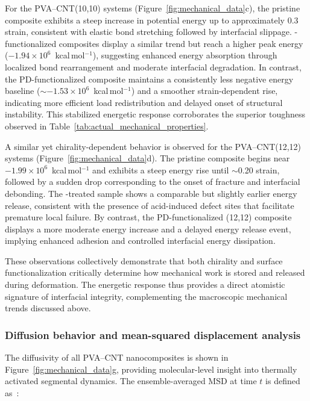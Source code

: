 \documentclass[journal=jacsat,manuscript=article]{achemso}
\begin{document}
{\medskip

For the PVA--CNT(10,10) systems (Figure~\ref{fig:mechanical_data}c), the pristine composite exhibits a steep increase in potential energy up to approximately 0.3 strain, consistent with elastic bond stretching followed by interfacial slippage. -functionalized composites display a similar trend but reach a higher peak energy ($-1.94\times10^{6}$~kcal\,mol$^{-1}$), suggesting enhanced energy absorption through localized bond rearrangement and moderate interfacial degradation. In contrast, the PD-functionalized composite maintains a consistently less negative energy baseline ($\sim-1.53\times10^{6}$~kcal\,mol$^{-1}$) and a smoother strain-dependent rise, indicating more efficient load redistribution and delayed onset of structural instability. This stabilized energetic response corroborates the superior toughness observed in Table~\ref{tab:actual_mechanical_properties}.

\medskip

A similar yet chirality-dependent behavior is observed for the PVA--CNT(12,12) systems (Figure~\ref{fig:mechanical_data}d). The pristine composite begins near $-1.99\times10^{6}$~kcal\,mol$^{-1}$ and exhibits a steep energy rise until $\sim$0.20 strain, followed by a sudden drop corresponding to the onset of fracture and interfacial debonding. The -treated sample shows a comparable but slightly earlier energy release, consistent with the presence of acid-induced defect sites that facilitate premature local failure. By contrast, the PD-functionalized (12,12) composite displays a more moderate energy increase and a delayed energy release event, implying enhanced adhesion and controlled interfacial energy dissipation. 

\medskip

These observations collectively demonstrate that both chirality and surface functionalization critically determine how mechanical work is stored and released during deformation. The energetic response thus provides a direct atomistic signature of interfacial integrity, complementing the macroscopic mechanical trends discussed above.


\subsubsection{Diffusion behavior and mean-squared displacement analysis}

The diffusivity of all PVA--CNT nanocomposites is shown in Figure~\ref{fig:mechanical_data}g, providing molecular-level insight into thermally activated segmental dynamics. The ensemble-averaged MSD at time $t$ is defined as~\cite{wunderle2009molecular}:

}
\end{document}
